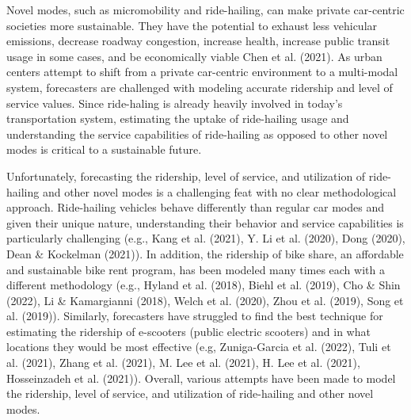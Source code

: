 \documentclass[fancy, masters]{byuthesis}
\begin{document}
Novel modes, such as micromobility and ride-hailing, can make private car-centric societies more sustainable. They have the potential to exhaust less vehicular emissions, decrease roadway congestion, increase health, increase public transit usage in some cases, and be economically viable Chen et al. (2021). As urban centers attempt to shift from a private car-centric environment to a multi-modal system, forecasters are challenged with modeling accurate ridership and level of service values. Since ride-haling is already heavily involved in today's transportation system, estimating the uptake of ride-hailing usage and understanding the service capabilities of ride-hailing as opposed to other novel modes is critical to a sustainable future.

Unfortunately, forecasting the ridership, level of service, and utilization of ride-hailing and other novel modes is a challenging feat with no clear methodological approach. Ride-hailing vehicles behave differently than regular car modes and given their unique nature, understanding their behavior and service capabilities is particularly challenging (e.g., Kang et al. (2021), Y. Li et al. (2020), Dong (2020), Dean \& Kockelman (2021)). In addition, the ridership of bike share, an affordable and sustainable bike rent program, has been modeled many times each with a different methodology (e.g., Hyland et al. (2018), Biehl et al. (2019), Cho \& Shin (2022), Li \& Kamargianni (2018), Welch et al. (2020), Zhou et al. (2019), Song et al. (2019)). Similarly, forecasters have struggled to find the best technique for estimating the ridership of e-scooters (public electric scooters) and in what locations they would be most effective (e.g, Zuniga-Garcia et al. (2022), Tuli et al. (2021), Zhang et al. (2021), M. Lee et al. (2021), H. Lee et al. (2021), Hosseinzadeh et al. (2021)). Overall, various attempts have been made to model the ridership, level of service, and utilization of ride-hailing and other novel modes.
\end{document}
